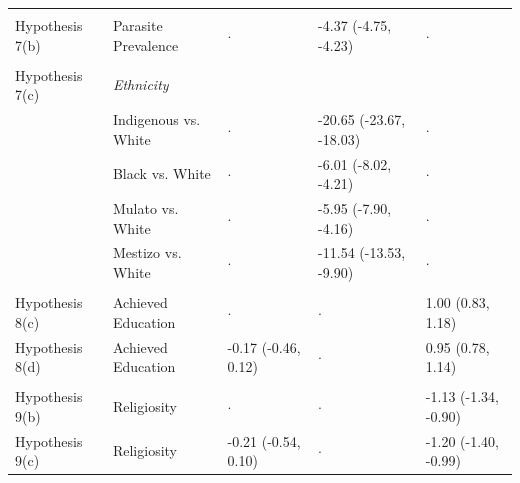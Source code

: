 \documentclass[12pt]{article}
\begin{document}
\begin{table}[h]
\begin{footnotesize}
\begin{tabular}{@{}lllll@{}}
                    &                                          &                              &                                &                                     \\
Hypothesis 7(b)     & Parasite Prevalence                      & $\cdot$                      & -4.37 (-4.75, -4.23)    & $\cdot$                             \\
                    &                                          &                              &                                &                                     \\
Hypothesis 7(c)     & \textit{Ethnicity }                               &                              &                                &                                     \\
                    & Indigenous vs. White                     & $\cdot$                      & -20.65 (-23.67, -18.03) & $\cdot$                             \\
                    & Black vs. White                          & $\cdot$                      & -6.01 (-8.02, -4.21)    & $\cdot$                             \\
                    & Mulato vs. White                         & $\cdot$                      & -5.95 (-7.90, -4.16)    & $\cdot$                             \\
                    & Mestizo vs. White                        & $\cdot$                      & -11.54 (-13.53, -9.90)  & $\cdot$                             \\
                    &                                          &                              &                                &                                     \\
Hypothesis 8(c)     & Achieved Education                       & $\cdot$                      & $\cdot$                        & 1.00 (0.83, 1.18)           \\
Hypothesis 8(d)     & Achieved Education                       & -0.17 (-0.46, 0.12)  & $\cdot$                        & 0.95 (0.78, 1.14)            \\
                    &                                          &                              &                                &                                     \\
Hypothesis 9(b)     & Religiosity                             & $\cdot$                      & $\cdot$                        & -1.13 (-1.34, -0.90)        \\
Hypothesis 9(c)     & Religiosity                             & -0.21 (-0.54, 0.10)  & $\cdot$                        & -1.20 (-1.40, -0.99)         \\ \bottomrule
\end{tabular}
\end{footnotesize}
\end{table}
\end{document}
